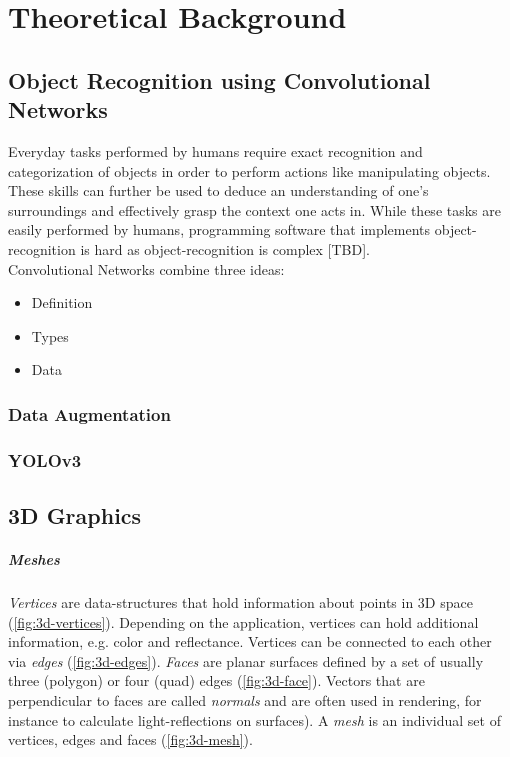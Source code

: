 

\chapter{Theoretical Background}

\section{Object Recognition using Convolutional Networks}
Everyday tasks performed by humans require exact recognition and categorization of objects in order to perform actions like manipulating objects. 
These skills can further be used to deduce an understanding of one's surroundings and effectively grasp the context one acts in. While these tasks are easily performed by humans, programming software that implements object-recognition is hard as object-recognition is complex [TBD].\\
Convolutional Networks combine three ideas: 

\begin{itemize}
\item Definition
\item Types
\item Data
\end{itemize}
\subsection{Data Augmentation}


\subsection{YOLOv3}

\section{3D Graphics}
\paragraph{Meshes} \textit{Vertices} are data-structures that hold information about points in 3D space (\ref{fig:3d-vertices}). Depending on the application, vertices can hold additional information, e.g. color and reflectance. Vertices can be connected to each other via \textit{edges} (\ref{fig:3d-edges}). \textit{Faces} are planar surfaces defined by a set of usually three (polygon) or four (quad) edges (\ref{fig:3d-face}). Vectors that are perpendicular to faces are called \textit{normals} and are often used in rendering, for instance to calculate light-reflections on surfaces). A \textit{mesh} is an individual set of vertices, edges and faces (\ref{fig:3d-mesh}). 

